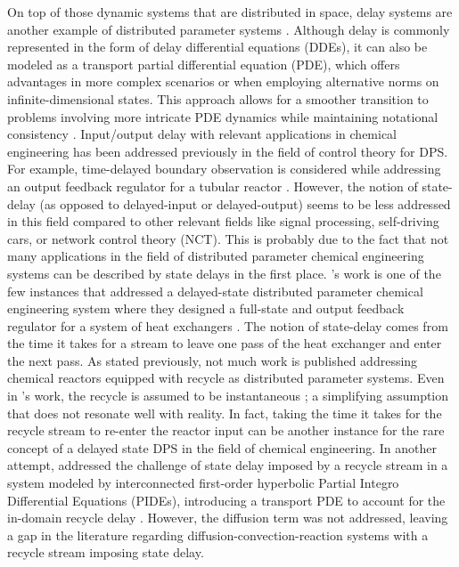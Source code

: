 On top of those dynamic systems that are distributed in space, delay systems are another example of distributed parameter systems \autocite{curtainbook}. Although delay is commonly represented in the form of delay differential equations (DDEs), it can also be modeled as a transport partial differential equation (PDE), which offers advantages in more complex scenarios or when employing alternative norms on infinite-dimensional states. This approach allows for a smoother transition to problems involving more intricate PDE dynamics while maintaining notational consistency \autocite{krstic2009book}. Input/output delay with relevant applications in chemical engineering has been addressed previously in the field of control theory for DPS. For example, time-delayed boundary observation is considered while addressing an output feedback regulator for a tubular reactor \autocite{Guilherme2019ACC}. However, the notion of state-delay (as opposed to delayed-input or delayed-output) seems to be less addressed in this field compared to other relevant fields like signal processing, self-driving cars, or network control theory (NCT). This is probably due to the fact that not many applications in the field of distributed parameter chemical engineering systems can be described by state delays in the first place. 's work is one of the few instances that addressed a delayed-state distributed parameter chemical engineering system where they designed a full-state and output feedback regulator for a system of heat exchangers \autocite{ozorio2019heat}. The notion of state-delay comes from the time it takes for a stream to leave one pass of the heat exchanger and enter the next pass. As stated previously, not much work is published addressing chemical reactors equipped with recycle as distributed parameter systems. Even in 's work, the recycle is assumed to be instantaneous \autocite{khatibi2021model}; a simplifying assumption that does not resonate well with reality. In fact, taking the time it takes for the recycle stream to re-enter the reactor input can be another instance for the rare concept of a delayed state DPS in the field of chemical engineering. In another attempt,  addressed the challenge of state delay imposed by a recycle stream in a system modeled by interconnected first-order hyperbolic Partial Integro Differential Equations (PIDEs), introducing a transport PDE to account for the in-domain recycle delay \autocite{qi2021output}. However, the diffusion term was not addressed, leaving a gap in the literature regarding diffusion-convection-reaction systems with a recycle stream imposing state delay.

